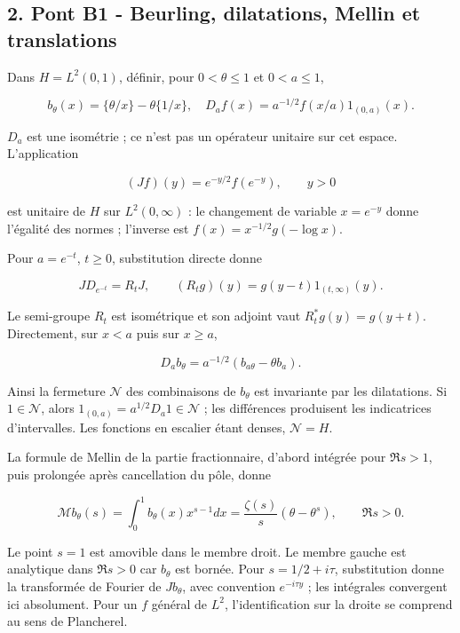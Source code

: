 \documentclass[
  10pt,
  a4paper,
]{article}
\begin{document}
\hypertarget{pont-b1---beurling-dilatations-mellin-et-translations}{%
\subsection{2. Pont B1 - Beurling, dilatations, Mellin et
translations}\label{pont-b1---beurling-dilatations-mellin-et-translations}}

Dans \(H=L^2(0,1)\), définir, pour \(0<\theta\le1\) et \(0<a\le1\),

\[
b_\theta(x)=\{\theta/x\}-\theta\{1/x\},\quad
D_af(x)=a^{-1/2}f(x/a)1_{(0,a)}(x).
\]

\(D_a\) est une isométrie ; ce n'est pas un opérateur unitaire sur cet
espace. L'application

\[
(Jf)(y)=e^{-y/2}f(e^{-y}),\qquad y>0
\]

est unitaire de \(H\) sur \(L^2(0,\infty)\) : le changement de variable
\(x=e^{-y}\) donne l'égalité des normes ; l'inverse est
\(f(x)=x^{-1/2}g(-\log x)\).

Pour \(a=e^{-t}\), \(t\ge0\), substitution directe donne

\[
JD_{e^{-t}}=R_tJ,\qquad
(R_tg)(y)=g(y-t)1_{(t,\infty)}(y).
\]

Le semi-groupe \(R_t\) est isométrique et son adjoint vaut
\(R_t^*g(y)=g(y+t)\). Directement, sur \(x<a\) puis sur \(x\ge a\),

\[
D_ab_\theta=a^{-1/2}(b_{a\theta}-\theta b_a).
\]

Ainsi la fermeture \(\mathcal N\) des combinaisons de \(b_\theta\) est
invariante par les dilatations. Si \(1\in\mathcal N\), alors
\(1_{(0,a)}=a^{1/2}D_a1\in\mathcal N\) ; les différences produisent les
indicatrices d'intervalles. Les fonctions en escalier étant denses,
\(\mathcal N=H\).

La formule de Mellin de la partie fractionnaire, d'abord intégrée pour
\(\Re s>1\), puis prolongée après cancellation du pôle, donne

\[
\mathcal Mb_\theta(s)=\int_0^1 b_\theta(x)x^{s-1}dx
=\frac{\zeta(s)}s(\theta-\theta^s),\qquad\Re s>0.
\]

Le point \(s=1\) est amovible dans le membre droit. Le membre gauche est
analytique dans \(\Re s>0\) car \(b_\theta\) est bornée. Pour
\(s=1/2+i\tau\), substitution donne la transformée de Fourier de
\(Jb_\theta\), avec convention \(e^{-i\tau y}\) ; les intégrales
convergent ici absolument. Pour un \(f\) général de \(L^2\),
l'identification sur la droite se comprend au sens de Plancherel.
\end{document}
